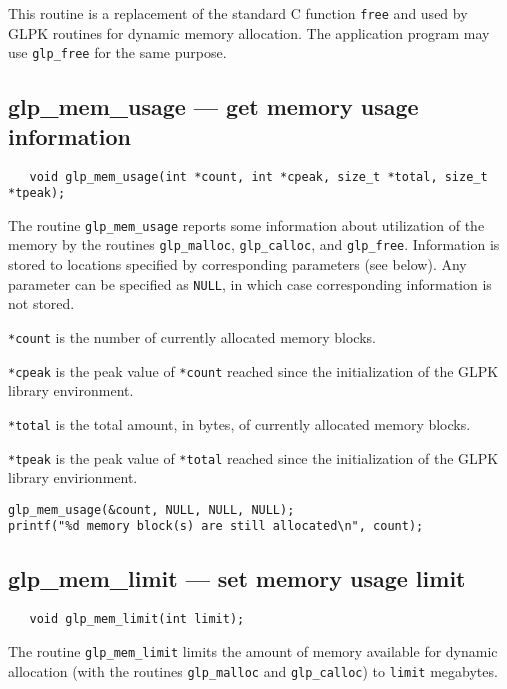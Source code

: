 This routine is a replacement of the standard C function \verb|free|
and used by GLPK routines for dynamic memory allocation. The
application program may use \verb|glp_free| for the same purpose.

\subsection{glp\_mem\_usage --- get memory usage information}

\synopsis

\begin{verbatim}
   void glp_mem_usage(int *count, int *cpeak, size_t *total, size_t *tpeak);
\end{verbatim}

\description

The routine \verb|glp_mem_usage| reports some information about
utilization of the memory by the routines \verb|glp_malloc|,
\verb|glp_calloc|, and \verb|glp_free|. Information is stored to
locations specified by corresponding parameters (see below). Any
parameter can be specified as \verb|NULL|, in which case corresponding
information is not stored.

\verb|*count| is the number of currently allocated memory blocks.

\verb|*cpeak| is the peak value of \verb|*count| reached since the
initialization of the GLPK library environment.

\verb|*total| is the total amount, in bytes, of currently allocated
memory blocks.

\verb|*tpeak| is the peak value of \verb|*total| reached since the
initialization of the GLPK library envirionment.


\begin{footnotesize}
\begin{verbatim}
glp_mem_usage(&count, NULL, NULL, NULL);
printf("%d memory block(s) are still allocated\n", count);
\end{verbatim}
\end{footnotesize}

\subsection{glp\_mem\_limit --- set memory usage limit}

\synopsis

\begin{verbatim}
   void glp_mem_limit(int limit);
\end{verbatim}

\description

The routine \verb|glp_mem_limit| limits the amount of memory available
for dynamic allocation (with the routines \verb|glp_malloc| and
\verb|glp_calloc|) to \verb|limit| megabytes.

